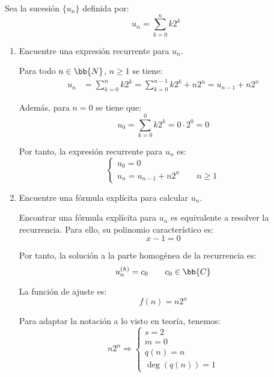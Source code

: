 \begin{ejercicio}
    Sea la sucesión $\{u_n\}$ definida por:
    \begin{equation*}
        u_n = \sum_{k = 0}^n k 2^k
    \end{equation*}
    \begin{enumerate}
        \item Encuentre una expresión recurrente para $u_n$.
        
        Para todo $n\in \bb{N}$, $n\geq 1$ se tiene:
        \begin{align*}
            u_n &= \sum_{k = 0}^n k 2^k = \sum_{k = 0}^{n-1} k 2^k + n2^n = u_{n-1} + n2^n
        \end{align*}

        Además, para $n=0$ se tiene que:
        \begin{equation*}
            u_0 = \sum_{k = 0}^0 k 2^k = 0\cdot 2^0 = 0
        \end{equation*}

        Por tanto, la expresión recurrente para $u_n$ es:
        \begin{equation*}
            \left\{\begin{array}{l}
                u_0 = 0 \\
                u_n = u_{n-1} + n2^n    \qquad n\geq 1
            \end{array}\right.
        \end{equation*}

        \item Encuentre una fórmula explícita para calcular $u_n$.
        
        Encontrar una fórmula explícita para $u_n$ es equivalente a resolver la recurrencia. Para ello, su polinomio característico es:
        \begin{equation*}
            x-1 = 0
        \end{equation*}

        Por tanto, la solución a la parte homogénea de la recurrencia es:
        \begin{equation*}
            u_n^{(h)} = c_0 \qquad c_0\in \bb{C}
        \end{equation*}

        La función de ajuste es:
        \begin{equation*}
            f(n) = n2^n
        \end{equation*}

        Para adaptar la notación a lo visto en teoría, tenemos:
        \begin{equation*}
            n2^n\Longrightarrow \left\{\begin{array}{l}
                s = 2 \\
                m = 0\\
                q(n) = n \\
                \deg(q(n)) = 1
            \end{array}\right.
        \end{equation*}


\end{enumerate}
\end{ejercicio}
